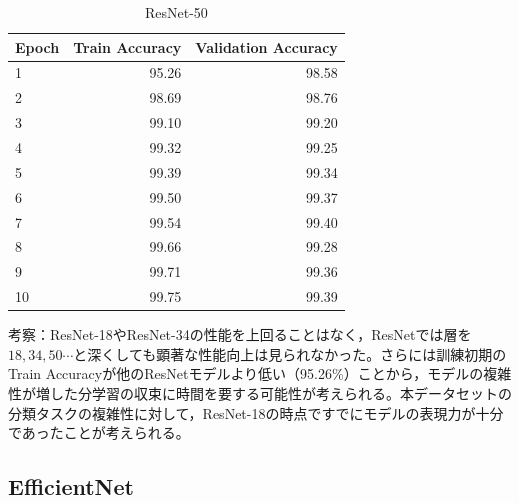 \documentclass[a4paper,11pt,titlepage]{jsarticle}
\begin{document}
\begin{table}[H]
\centering
\caption{ResNet-50}
\label{tab:ResNet50}
\begin{tabular}{lrr}
\hline
 Epoch &  Train Accuracy &  Validation Accuracy \\
\hline
     1 &           95.26 &                98.58 \\
     2 &           98.69 &                98.76 \\
     3 &           99.10 &                99.20 \\
     4 &           99.32 &                99.25 \\
     5 &           99.39 &                99.34 \\
     6 &           99.50 &                99.37 \\
     7 &           99.54 &                99.40 \\
     8 &           99.66 &                99.28 \\
     9 &           99.71 &                99.36 \\
    10 &           99.75 &                99.39 \\
\hline
\end{tabular}
\end{table}

考察：ResNet-18やResNet-34の性能を上回ることはなく，ResNetでは層を$18,34,50 \cdots$と深くしても顕著な性能向上は見られなかった。さらには訓練初期のTrain Accuracyが他のResNetモデルより低い（95.26\%）ことから，モデルの複雑性が増した分学習の収束に時間を要する可能性が考えられる。本データセットの分類タスクの複雑性に対して，ResNet-18の時点ですでにモデルの表現力が十分であったことが考えられる。


\subsection{EfficientNet}
\end{document}
